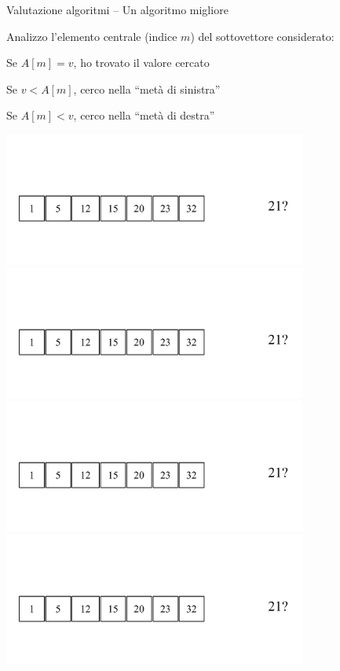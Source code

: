 \begin{frame}{Valutazione algoritmi -- Un algoritmo migliore}

\begin{myboxtitle}
Analizzo l'elemento centrale (indice $m$) del sottovettore considerato:

\BIL
  \item Se $A[m]=v$, ho trovato il valore cercato
  \item Se $v<A[m]$, cerco nella “metà di sinistra”
  \item Se $A[m]<v$, cerco nella “metà di destra”
\EIL
\end{myboxtitle}

\vspace{-24pt}
\begin{overprint}
\centering\includegraphics[width=10cm,page=1]{binarysearch.pdf}
\centering\includegraphics[width=10cm,page=2]{binarysearch.pdf}
\centering\includegraphics[width=10cm,page=3]{binarysearch.pdf}
\centering\includegraphics[width=10cm,page=4]{binarysearch.pdf}

\end{overprint}
\end{frame}
